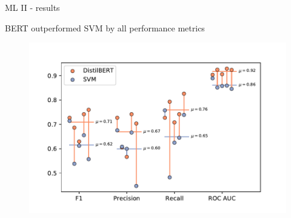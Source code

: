\documentclass[9pt]{beamer}
\begin{document}
\begin{frame}{ML II - results}

BERT outperformed SVM by all performance metrics

\begin{figure}
	\includegraphics[width=\linewidth]{../figures/SI_figure_3.pdf}
\end{figure}

\end{frame}
\end{document}
